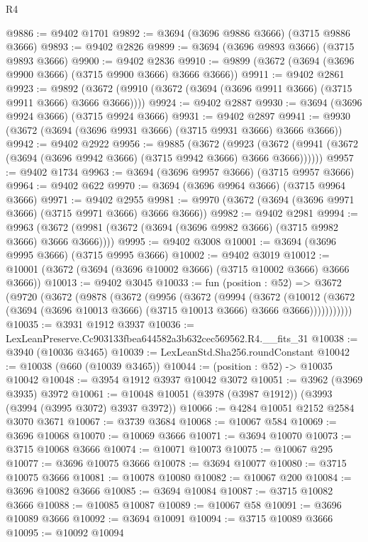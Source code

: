 \begin{lexlean}{R4}
\begin{coremodule}
@9886 := @9402 @1701
@9892 := @3694 (@3696 @9886 @3666) (@3715 @9886 @3666)
@9893 := @9402 @2826
@9899 := @3694 (@3696 @9893 @3666) (@3715 @9893 @3666)
@9900 := @9402 @2836
@9910 := @9899 (@3672 (@3694 (@3696 @9900 @3666) (@3715 @9900 @3666) @3666 @3666))
@9911 := @9402 @2861
@9923 := @9892 (@3672 (@9910 (@3672 (@3694 (@3696 @9911 @3666) (@3715 @9911 @3666) @3666 @3666))))
@9924 := @9402 @2887
@9930 := @3694 (@3696 @9924 @3666) (@3715 @9924 @3666)
@9931 := @9402 @2897
@9941 := @9930 (@3672 (@3694 (@3696 @9931 @3666) (@3715 @9931 @3666) @3666 @3666))
@9942 := @9402 @2922
@9956 := @9885
    (@3672
      (@9923 (@3672 (@9941 (@3672 (@3694 (@3696 @9942 @3666) (@3715 @9942 @3666) @3666 @3666))))))
@9957 := @9402 @1734
@9963 := @3694 (@3696 @9957 @3666) (@3715 @9957 @3666)
@9964 := @9402 @622
@9970 := @3694 (@3696 @9964 @3666) (@3715 @9964 @3666)
@9971 := @9402 @2955
@9981 := @9970 (@3672 (@3694 (@3696 @9971 @3666) (@3715 @9971 @3666) @3666 @3666))
@9982 := @9402 @2981
@9994 := @9963 (@3672 (@9981 (@3672 (@3694 (@3696 @9982 @3666) (@3715 @9982 @3666) @3666 @3666))))
@9995 := @9402 @3008
@10001 := @3694 (@3696 @9995 @3666) (@3715 @9995 @3666)
@10002 := @9402 @3019
@10012 := @10001 (@3672 (@3694 (@3696 @10002 @3666) (@3715 @10002 @3666) @3666 @3666))
@10013 := @9402 @3045
@10033 := fun (position : @52) =>
  @3672
    (@9720
      (@3672
        (@9878
          (@3672
            (@9956
              (@3672
                (@9994
                  (@3672
                    (@10012
                      (@3672 (@3694 (@3696 @10013 @3666) (@3715 @10013 @3666) @3666 @3666)))))))))))
@10035 := @3931 @1912 @3937
@10036 := LexLeanPreserve.Cc903133fbea644582a3b632cec569562.R4.__fits_31
@10038 := @3940 (@10036 @3465)
@10039 := LexLeanStd.Sha256.roundConstant
@10042 := @10038 (@660 (@10039 @3465))
@10044 := (position : @52) -> @10035 @10042
@10048 := @3954 @1912 @3937 @10042 @3072
@10051 := @3962 (@3969 @3935) @3972
@10061 := @10048 @10051 (@3978 (@3987 @1912)) (@3993 (@3994 (@3995 @3072) @3937 @3972))
@10066 := @4284 @10051 @2152 @2584 @3070 @3671
@10067 := @3739 @3684
@10068 := @10067 @584
@10069 := @3696 @10068
@10070 := @10069 @3666
@10071 := @3694 @10070
@10073 := @3715 @10068 @3666
@10074 := @10071 @10073
@10075 := @10067 @295
@10077 := @3696 @10075 @3666
@10078 := @3694 @10077
@10080 := @3715 @10075 @3666
@10081 := @10078 @10080
@10082 := @10067 @200
@10084 := @3696 @10082 @3666
@10085 := @3694 @10084
@10087 := @3715 @10082 @3666
@10088 := @10085 @10087
@10089 := @10067 @58
@10091 := @3696 @10089 @3666
@10092 := @3694 @10091
@10094 := @3715 @10089 @3666
@10095 := @10092 @10094

\end{coremodule}
\end{lexlean}
